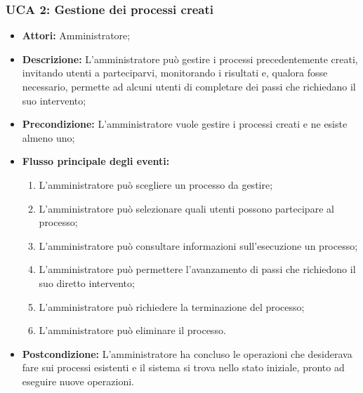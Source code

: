 \subsubsection{UCA 2: Gestione dei processi creati}
\begin{itemize}
\item \textbf{Attori:}
 Amministratore;
\item \textbf{Descrizione:} 
L'amministratore può gestire i processi precedentemente creati, invitando utenti a parteciparvi, monitorando i risultati e, qualora fosse necessario, permette ad alcuni utenti di completare dei passi che richiedano il suo intervento;
\item \textbf{Precondizione:} 
L'amministratore vuole gestire i processi creati e ne esiste almeno uno;
\item \textbf{Flusso principale degli eventi:} 
\begin{enumerate}
\item L'amministratore può scegliere un processo da gestire;
\item L'amministratore può selezionare quali utenti possono partecipare al processo;
\item L'amministratore può consultare informazioni sull'esecuzione un processo;
\item L'amministratore può permettere l'avanzamento di passi che richiedono il suo diretto intervento;
\item L'amministratore può richiedere la terminazione del processo;
\item L'amministratore può eliminare il processo.
\end{enumerate}
\item \textbf{Postcondizione:} 
L'amministratore ha concluso le operazioni che desiderava fare sui processi esistenti e il sistema si trova nello stato iniziale, pronto ad eseguire nuove operazioni.
\end{itemize}

\hypertarget{A2.1}{}

